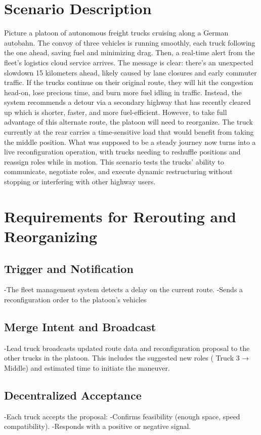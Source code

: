 \documentclass[english]{lni}
\begin{document}
\section{Scenario Description}
Picture a platoon of autonomous freight trucks cruising along a German autobahn. The convoy of three vehicles is running smoothly, each truck following the one ahead, saving fuel and minimizing drag. Then, a real-time alert from the fleet’s logistics cloud service arrives.
The message is clear: there's an unexpected slowdown 15 kilometers ahead, likely caused by lane closures and early commuter traffic. If the trucks continue on their original route, they will hit the congestion head-on, lose precious time, and burn more fuel idling in traffic.
Instead, the system recommends a detour via a secondary highway that has recently cleared up which is shorter, faster, and more fuel-efficient. However, to take full advantage of this alternate route, the platoon will need to reorganize. The truck currently at the rear carries a time-sensitive load that would benefit from taking the middle position. What was supposed to be a steady journey now turns into a live reconfiguration operation, with trucks needing to reshuffle positions and reassign roles while in motion.
This scenario tests the trucks’ ability to communicate, negotiate roles, and execute dynamic restructuring without stopping or interfering with other highway users.

\section{Requirements for Rerouting and Reorganizing}

\subsection{Trigger and Notification}
-The fleet management system detects a delay on the current route.
-Sends a reconfiguration order to the platoon's vehicles


\subsection{Merge Intent and Broadcast}
-Lead truck broadcasts updated route data and reconfiguration proposal to the other trucks in the platoon. This includes the suggested new roles ( Truck 3 → Middle) and estimated time to initiate the maneuver.

\subsection{Decentralized Acceptance}
-Each truck accepts the proposal:
-Confirms feasibility (enough space, speed compatibility).
-Responds with a positive or negative signal.
\end{document}

